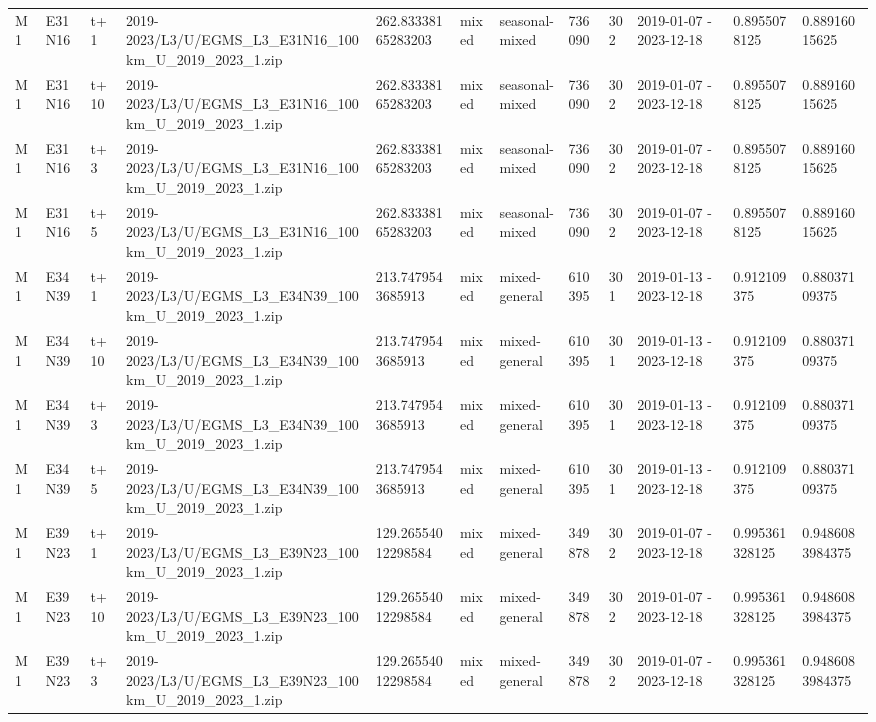 \begin{landscape}
\begin{longtable}{llllllllllll}
M1 & E31N16 & t+1 & 2019-2023/L3/U/EGMS\_L3\_E31N16\_100km\_U\_2019\_2023\_1.zip & 262.83338165283203 & mixed & seasonal-mixed & 736090 & 302 & 2019-01-07 - 2023-12-18 & 0.8955078125 & 0.88916015625 \\
M1 & E31N16 & t+10 & 2019-2023/L3/U/EGMS\_L3\_E31N16\_100km\_U\_2019\_2023\_1.zip & 262.83338165283203 & mixed & seasonal-mixed & 736090 & 302 & 2019-01-07 - 2023-12-18 & 0.8955078125 & 0.88916015625 \\
M1 & E31N16 & t+3 & 2019-2023/L3/U/EGMS\_L3\_E31N16\_100km\_U\_2019\_2023\_1.zip & 262.83338165283203 & mixed & seasonal-mixed & 736090 & 302 & 2019-01-07 - 2023-12-18 & 0.8955078125 & 0.88916015625 \\
M1 & E31N16 & t+5 & 2019-2023/L3/U/EGMS\_L3\_E31N16\_100km\_U\_2019\_2023\_1.zip & 262.83338165283203 & mixed & seasonal-mixed & 736090 & 302 & 2019-01-07 - 2023-12-18 & 0.8955078125 & 0.88916015625 \\
M1 & E34N39 & t+1 & 2019-2023/L3/U/EGMS\_L3\_E34N39\_100km\_U\_2019\_2023\_1.zip & 213.7479543685913 & mixed & mixed-general & 610395 & 301 & 2019-01-13 - 2023-12-18 & 0.912109375 & 0.88037109375 \\
M1 & E34N39 & t+10 & 2019-2023/L3/U/EGMS\_L3\_E34N39\_100km\_U\_2019\_2023\_1.zip & 213.7479543685913 & mixed & mixed-general & 610395 & 301 & 2019-01-13 - 2023-12-18 & 0.912109375 & 0.88037109375 \\
M1 & E34N39 & t+3 & 2019-2023/L3/U/EGMS\_L3\_E34N39\_100km\_U\_2019\_2023\_1.zip & 213.7479543685913 & mixed & mixed-general & 610395 & 301 & 2019-01-13 - 2023-12-18 & 0.912109375 & 0.88037109375 \\
M1 & E34N39 & t+5 & 2019-2023/L3/U/EGMS\_L3\_E34N39\_100km\_U\_2019\_2023\_1.zip & 213.7479543685913 & mixed & mixed-general & 610395 & 301 & 2019-01-13 - 2023-12-18 & 0.912109375 & 0.88037109375 \\
M1 & E39N23 & t+1 & 2019-2023/L3/U/EGMS\_L3\_E39N23\_100km\_U\_2019\_2023\_1.zip & 129.26554012298584 & mixed & mixed-general & 349878 & 302 & 2019-01-07 - 2023-12-18 & 0.995361328125 & 0.9486083984375 \\
M1 & E39N23 & t+10 & 2019-2023/L3/U/EGMS\_L3\_E39N23\_100km\_U\_2019\_2023\_1.zip & 129.26554012298584 & mixed & mixed-general & 349878 & 302 & 2019-01-07 - 2023-12-18 & 0.995361328125 & 0.9486083984375 \\
M1 & E39N23 & t+3 & 2019-2023/L3/U/EGMS\_L3\_E39N23\_100km\_U\_2019\_2023\_1.zip & 129.26554012298584 & mixed & mixed-general & 349878 & 302 & 2019-01-07 - 2023-12-18 & 0.995361328125 & 0.9486083984375 \\

\end{longtable}
\end{landscape}
